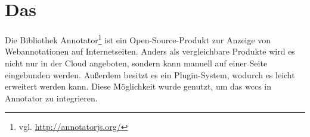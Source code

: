 \section{Das {\annotatorPlugin}}
    \label{section:solutionDetailsAnnotatorPlugin}
    Die Bibliothek Annotator\footnote{vgl. \url{http://annotatorjs.org/}}
    ist ein Open-Source-Produkt zur Anzeige von Webannotationen auf Internetseiten.
    Anders als vergleichbare Produkte wird es nicht nur in der Cloud angeboten,
    sondern kann manuell auf einer Seite eingebunden werden.
    Außerdem besitzt es ein Plugin-System, wodurch es leicht erweitert werden kann.
    Diese Möglichkeit wurde genutzt,
    um das \gls{wccs} in Annotator zu integrieren.

    
    